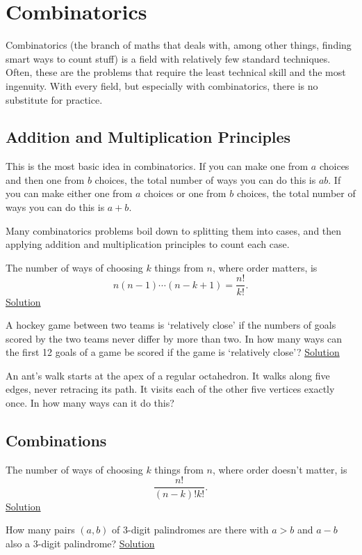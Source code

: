 \section{Combinatorics}
Combinatorics (the branch of maths that deals with, among other things, finding
smart ways to count stuff) is a field with relatively few standard techniques.
Often, these are the problems that require the least technical skill and the
most ingenuity. With every field, but especially with combinatorics, there is no
substitute for practice.
\subsection{Addition and Multiplication Principles}
This is the most basic idea in combinatorics. If you can make one from $a$
choices and then one from $b$ choices, the total number of ways you can do this
is $ab$. If you can make either one from $a$ choices or one from $b$ choices,
the total number of ways you can do this is $a+b$.

Many combinatorics problems boil down to splitting them into cases, and
then applying addition and multiplication principles to count each case.
\begin{result}\label{r:b:c:am:1}
  The number of ways of choosing $k$ things from $n$, where order matters, is
  \[n(n-1)\cdots(n-k+1)=\frac{n!}{k!}.\]
  \hyperlink{sr:b:c:am:1}{Solution}
\end{result}
\begin{problem}\label{p:b:c:am:1}
  A hockey game between two teams is `relatively close' if the numbers of goals
  scored by the two teams never differ by more than two. In how many ways can
  the first 12 goals of a game be scored if the game is `relatively close'?
  \hyperlink{sp:b:c:am:1}{Solution}
\end{problem}
\begin{problem}\label{p:b:c:am:2}
  An ant's walk starts at the apex of a regular octahedron. It walks along five
  edges, never retracing its path. It visits each of the other five vertices
  exactly once. In how many ways can it do this?
\end{problem}
\subsection{Combinations}
\begin{result}\label{r:b:c:c:1}
  The number of ways of choosing $k$ things from $n$, where order doesn't
  matter, is \[\frac{n!}{(n-k)!k!}.\]
  \hyperlink{sr:b:c:c:1}{Solution}
\end{result}
\begin{problem}{\label{p:b:c:c:1}}
  How many pairs $(a,b)$ of 3-digit palindromes are there with $a>b$ and
  $a-b$ also a 3-digit palindrome?
  \hyperlink{sp:b:c:c:1}{Solution}
\end{problem}
